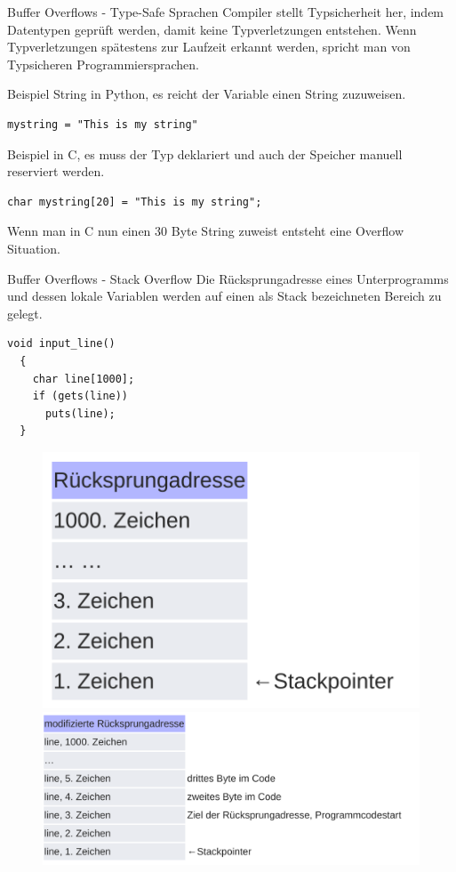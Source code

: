 \documentclass[10pt]{beamer}
\begin{document}
\begin{frame}[fragile]{Buffer Overflows - Type-Safe Sprachen}
  Compiler stellt Typsicherheit her, indem Datentypen gepr\"uft werden, damit keine Typverletzungen entstehen.
  Wenn Typverletzungen sp\"atestens zur Laufzeit erkannt werden, spricht man von Typsicheren Programmiersprachen.

  Beispiel String in Python, es reicht der Variable einen String zuzuweisen.
  \begin{lstlisting}[style=CStyle]
    mystring = "This is my string"
  \end{lstlisting}

  Beispiel in C, es muss der Typ deklariert und auch der Speicher manuell reserviert werden.
  \begin{lstlisting}[style=CStyle]
    char mystring[20] = "This is my string";
  \end{lstlisting}
  Wenn man in C nun einen 30 Byte String zuweist entsteht eine Overflow Situation.
\end{frame}

\begin{frame}[fragile]{Buffer Overflows - Stack Overflow}
 Die R\"ucksprungadresse eines Unterprogramms und dessen lokale Variablen werden auf einen als Stack bezeichneten Bereich zu gelegt.
 \begin{lstlisting}[style=CStyle]
  void input_line()
  {
    char line[1000];
    if (gets(line))
      puts(line);
  }
 \end{lstlisting}

 \begin{figure}%
  \centering
  {\includegraphics[scale=0.10]{stackoverflow}}%
  \quad
  {\includegraphics[scale=0.10]{stackoverflow_2}}%
 \end{figure}
\end{frame}
\end{document}

